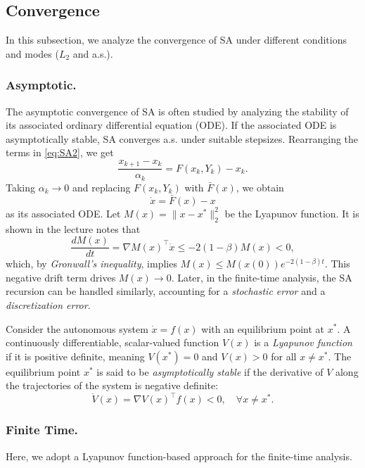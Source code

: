 \documentclass[11pt,twoside]{article}
\begin{document}
\subsection{Convergence}
In this subsection, we analyze the convergence of SA under different conditions and modes ($L_2$ and a.s.).

\subsubsection{Asymptotic.}
The asymptotic convergence of SA is often studied by analyzing the stability of its associated ordinary differential equation (ODE). If the associated ODE is asymptotically stable, SA converges a.s. under suitable stepsizes. Rearranging the terms in \eqref{eq:SA2}, we get
\[
\frac{x_{k+1}-x_k}{\alpha_k} = F(x_k,Y_k) - x_k.
\]
Taking $\alpha_k \to 0$ and replacing $F(x_k,Y_k)$ with $\bar F(x)$, we obtain
\[
\dot{x} =\bar F(x) - x
\]
as its associated ODE. Let $M(x) = \|x-x^*\|_2^2$ be the Lyapunov function. It is shown in the lecture notes that
\[
\frac{dM(x)}{dt} = \nabla M(x)^\top \dot{x} \leq -2(1-\beta)M(x) <0,
\]
which, by \emph{Gronwall's inequality}, implies $M(x) \leq M(x(0)) e^{-2(1-\beta)t}$. This negative drift term drives $M(x) \to 0$. Later, in the finite-time analysis, the SA recursion can be handled similarly, accounting for a \emph{stochastic error} and a \emph{discretization error}. 

\begin{definition}
Consider the autonomous system $\dot{x} = f(x)$ with an equilibrium point at $x^*$. A continuously differentiable, scalar-valued function $V(x)$ is a \emph{Lyapunov function} if it is positive definite, meaning $V(x^*) = 0$ and $V(x) > 0$ for all $x \neq x^*$. The equilibrium point $x^*$ is said to be \emph{asymptotically stable} if the derivative of $V$ along the trajectories of the system is negative definite:
\[
\dot{V}(x) = \nabla V(x)^\top f(x) < 0, \quad \forall x \neq x^*.
\]
\end{definition}

\subsubsection{Finite Time.}
Here, we adopt a Lyapunov function-based approach for the finite-time analysis.
\end{document}
